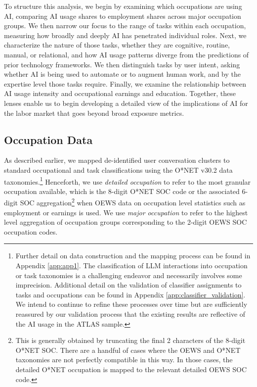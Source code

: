 \documentclass[11pt,a4paper]{article}
\begin{document}
To structure this analysis, we begin by examining which occupations are using AI, comparing AI usage shares to employment shares across major occupation groups. We then narrow our focus to the range of tasks within each occupation, measuring how broadly and deeply AI has penetrated individual roles. Next, we characterize the nature of those tasks, whether they are cognitive, routine, manual, or relational, and how AI usage patterns diverge from the predictions of prior technology frameworks. We then distinguish tasks by user intent, asking whether AI is being used to automate or to augment human work, and by the expertise level those tasks require. Finally, we examine the relationship between AI usage intensity and occupational earnings and education. Together, these lenses enable us to begin developing a detailed view of the implications of AI for the labor market that goes beyond broad exposure metrics.

\subsection{Occupation Data}

As described earlier, we mapped de-identified user conversation clusters to standard occupational and task classifications using the O*NET v30.2 data taxonomies.\footnote{Further detail on data construction and the mapping process can be found in Appendix \ref{app:app1}. The classification of LLM interactions into occupation or task taxonomies is a challenging endeavor and necessarily involves some imprecision. Additional detail on the validation of classifier assignments to tasks and occupations can be found in Appendix \ref{app:classifier_validation}. We intend to continue to refine these processes over time but are sufficiently reassured by our validation process that the existing results are reflective of the AI usage in the ATLAS sample.} Henceforth, we use \textit{detailed occupation} to refer to the most granular occupation available, which is the 8-digit O*NET SOC code or the associated 6-digit SOC aggregation\footnote{This is generally obtained by truncating the final 2 characters of the 8-digit O*NET SOC. There are a handful of cases where the OEWS and O*NET taxonomies are not perfectly compatible in this way. In those cases, the detailed O*NET occupation is mapped to the relevant detailed OEWS SOC code.} when OEWS data on occupation level statistics such as employment or earnings is used. We use \textit{major occupation} to refer to the highest level aggregation of occupation groups corresponding to the 2-digit OEWS SOC occupation codes.
\end{document}

